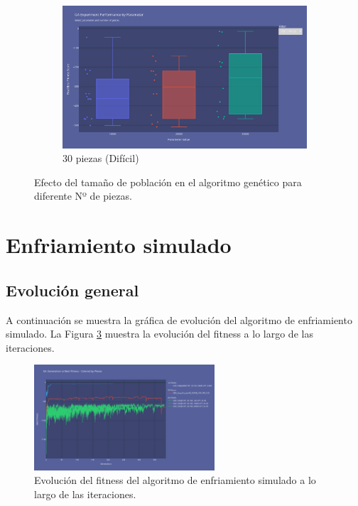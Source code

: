 \documentclass[11pt,spanish,listoffigures,listoftables]{tfgetsinf}
\begin{document}
\begin{figure}[H]
    \begin{subfigure}[b]{0.48\textwidth}
        \centering
        \includegraphics[width=\textwidth]{images/GA_np-30_population.png}
        \caption{30 piezas (Difícil)}
        \label{fig:ga_np30_population}
    \end{subfigure}
    \caption{Efecto del tamaño de población en el algoritmo genético para diferente Nº de piezas.}
    \label{fig:ga_population}
\end{figure}

\clearpage
\section{Enfriamiento simulado}

\subsection{Evolución general}

A continuación se muestra la gráfica de evolución del algoritmo de enfriamiento simulado. La Figura \ref{fig:sa_evolution} muestra la evolución del fitness a lo largo de las iteraciones.

\begin{figure}[H]
    \centering
    \includegraphics[width=0.6\textwidth]{images/SA_evolution.png}
    \caption{Evolución del fitness del algoritmo de enfriamiento simulado a lo largo de las iteraciones.}
    \label{fig:sa_evolution}
\end{figure}
\end{document}
